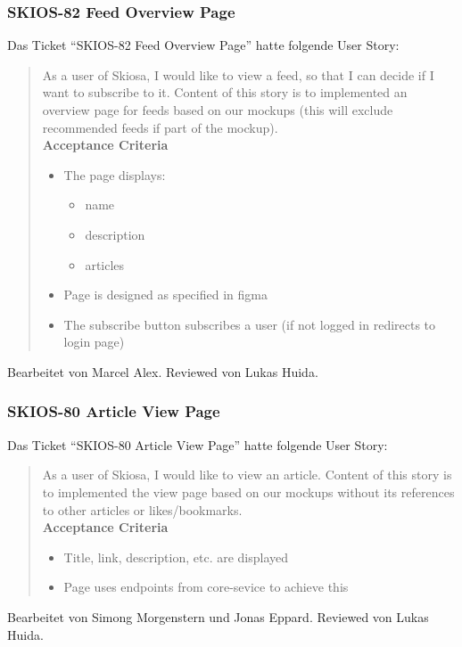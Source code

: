 \subsubsection{SKIOS-82 Feed Overview Page}
Das Ticket \enquote{SKIOS-82 Feed Overview Page} hatte folgende User Story:
\begin{quotation}
    As a user of Skiosa, I would like to view a feed, so that I can decide if I want to subscribe to it.
    Content of this story is to implemented an overview page for feeds based on our mockups (this will exclude recommended feeds if part of the mockup). \\
\textbf{Acceptance Criteria}
\begin{itemize}
    \item The page displays: 
    \begin{itemize}
        \item name
        \item description
        \item articles
    \end{itemize}
    \item Page is designed as specified in figma
    \item The subscribe button subscribes a user (if not logged in redirects to login page)
\end{itemize}
\end{quotation}
Bearbeitet von Marcel Alex.
Reviewed von Lukas Huida.

\subsubsection{SKIOS-80 Article View Page}
Das Ticket \enquote{SKIOS-80 Article View Page} hatte folgende User Story:
\begin{quotation}
    As a user of Skiosa, I would like to view an article.
    Content of this story is to implemented the view page based on our mockups without its references to other articles or likes/bookmarks. \\
\textbf{Acceptance Criteria}
\begin{itemize}
    \item Title, link, description, etc. are displayed 
    \item Page uses endpoints from core-sevice to achieve this
\end{itemize}
\end{quotation}
Bearbeitet von Simong Morgenstern und Jonas Eppard.
Reviewed von Lukas Huida.


